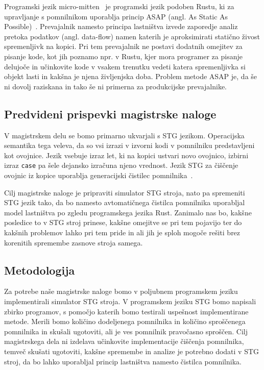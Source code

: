 \documentclass[a4paper, 12pt]{article}
\begin{document}

Programski jezik micro-mitten~\cite{} je programski jezik podoben Rustu, ki za upravljanje s pomnilnikom uporablja princip ASAP (angl. As Static As Possible)~\cite{proust2017asap}. Prevajalnik namesto principa lastništva izvede zaporedje analiz pretoka podatkov (angl. data-flow) namen katerih je aproksimirati statično živost spremenljivk na kopici. Pri tem prevajalnik ne postavi dodatnih omejitev za pisanje kode, kot jih poznamo npr. v Rustu, kjer mora programer za pisanje delujoče in učinkovite kode v vsakem trenutku vedeti katera spremenljivka si objekt lasti in kakšna je njena življenjska doba. Problem metode ASAP je, da še ni dovolj raziskana in tako še ni primerna za produkcijske prevajalnike.

\subsection{Predvideni prispevki magistrske naloge}

V magistrskem delu se bomo primarno ukvarjali s STG jezikom. Operacijska semantika tega veleva, da so vsi izrazi v izvorni kodi v pomnilniku predstavljeni kot ovojnice. Jezik vsebuje izraz let, ki na kopici ustvari novo ovojnico, izbirni izraz \texttt{case} pa šele dejansko izračuna njeno vrednost. Jezik STG za čiščenje ovojnic iz kopice uporablja generacijski čistilec pomnilnika~\cite{jones1992implementing, marlow2004making}. 

Cilj magistrske naloge je pripraviti simulator STG stroja, nato pa spremeniti STG jezik tako, da bo namesto avtomatičnega čistilca pomnilnika uporabljal model lastništva po zgledu programskega jezika Rust. Zanimalo nas bo, kakšne posledice to v STG stroj prinese, kakšne omejitve se pri tem pojavijo ter do kakšnih problemov lahko pri tem pride in ali jih je sploh mogoče rešiti brez korenitih spremembe zasnove stroja samega.

\subsection{Metodologija}


Za potrebe naše magistrske naloge bomo v poljubnem programskem jeziku implementirali simulator STG stroja. V programskem jeziku STG bomo napisali zbirko programov, s pomočjo katerih bomo testirali uspešnost implementirane metode. Merili bomo količino dodeljenega pomnilnika in količino sproščenega pomnilnika in skušali ugotoviti, ali je ves pomnilnik pravočasno sproščen. Cilj magistrskega dela ni izdelava učinkovite implementacije čiščenja pomnilnika, temveč skušati ugotoviti, kakšne spremembe in analize je potrebno dodati v STG stroj, da bo lahko uporabljal princip lastništva namesto čistilca pomnilnika.   
\end{document}
